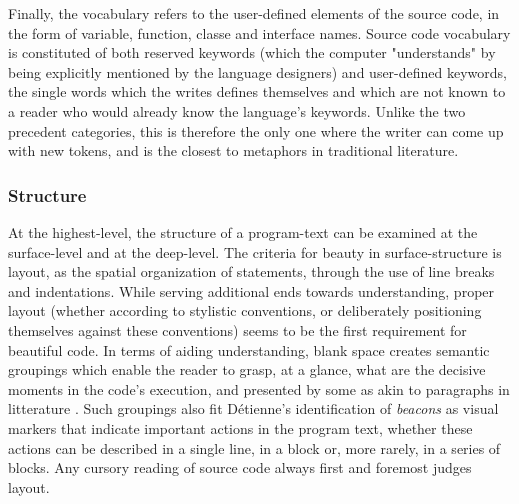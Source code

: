 Finally, the vocabulary refers to the user-defined elements of the source code, in the form of variable, function, classe and interface names. Source code vocabulary is constituted of both reserved keywords (which the computer "understands" by being explicitly mentioned by the language designers) and user-defined keywords, the single words which the writes defines themselves and which are not known to a reader who would already know the language's keywords. Unlike the two precedent categories, this is therefore the only one where the writer can come up with new tokens, and is the closest to metaphors in traditional literature.

\subsubsection{Structure}
\label{subsubsec:framework-structure}

At the highest-level, the structure of a program-text can be examined at the surface-level and at the deep-level. The criteria for beauty in surface-structure is layout, as the spatial organization of statements, through the use of line breaks and indentations. While serving additional ends towards understanding, proper layout (whether according to stylistic conventions, or deliberately positioning themselves against these conventions) seems to be the first requirement for beautiful code. In terms of aiding understanding, blank space creates semantic groupings which enable the reader to grasp, at a glance, what are the decisive moments \citep{sennett_craftsman_2009} in the code's execution, and presented by some as akin to paragraphs in litterature \citep{matsumoto_treating_2007}. Such groupings also fit Détienne's identification of \emph{beacons} \citep{detienne_software_2001} as visual markers that indicate important actions in the program text, whether these actions can be described in a single line, in a block or, more rarely, in a series of blocks. Any cursory reading of source code always first and foremost judges layout.

